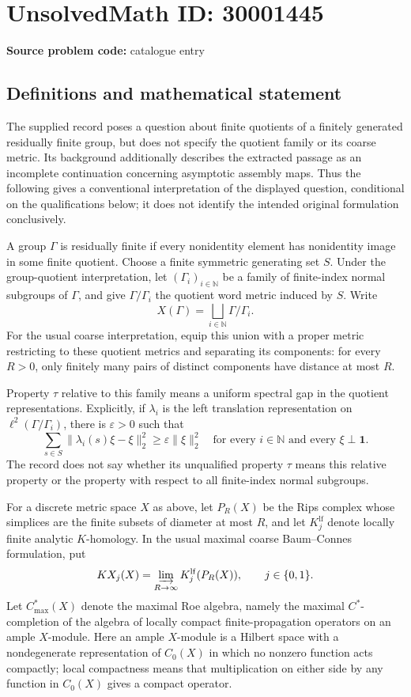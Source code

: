 \documentclass[11pt]{article}
\newcommand{\N}{\mathbb{N}}
\begin{document}
\section*{UnsolvedMath ID: 30001445}
\textbf{Source problem code:} catalogue entry
\subsection{Definitions and mathematical statement}
The supplied record poses a question about finite quotients of a finitely generated residually finite group, but does not specify the quotient family or its coarse metric. Its background additionally describes the extracted passage as an incomplete continuation concerning asymptotic assembly maps. Thus the following gives a conventional interpretation of the displayed question, conditional on the qualifications below; it does not identify the intended original formulation conclusively.

A group \(\Gamma\) is residually finite if every nonidentity element has nonidentity image in some finite quotient. Choose a finite symmetric generating set \(S\). Under the group-quotient interpretation, let \((\Gamma_i)_{i\in\N}\) be a family of finite-index normal subgroups of \(\Gamma\), and give \(\Gamma/\Gamma_i\) the quotient word metric induced by \(S\). Write
\[
X(\Gamma)=\bigsqcup_{i\in\N}\Gamma/\Gamma_i.
\]
For the usual coarse interpretation, equip this union with a proper metric restricting to these quotient metrics and separating its components: for every \(R>0\), only finitely many pairs of distinct components have distance at most \(R\).

Property \(\tau\) relative to this family means a uniform spectral gap in the quotient representations. Explicitly, if \(\lambda_i\) is the left translation representation on \(\ell^2(\Gamma/\Gamma_i)\), there is \(\varepsilon>0\) such that
\[
\sum_{s\in S}\|\lambda_i(s)\xi-\xi\|_2^2
\geq \varepsilon\|\xi\|_2^2
\quad\text{for every }i\in\N
\text{ and every }\xi\perp\mathbf{1}.
\]
The record does not say whether its unqualified property \(\tau\) means this relative property or the property with respect to all finite-index normal subgroups.

For a discrete metric space \(X\) as above, let \(P_R(X)\) be the Rips complex whose simplices are the finite subsets of diameter at most \(R\), and let \(K_j^{\mathrm{lf}}\) denote locally finite analytic \(K\)-homology. In the usual maximal coarse Baum--Connes formulation, put
\[
KX_j(X)=\varinjlim_{R\to\infty}K_j^{\mathrm{lf}}(P_R(X)),
\qquad j\in\{0,1\}.
\]
Let \(C^*_{\max}(X)\) denote the maximal Roe algebra, namely the maximal \(C^*\)-completion of the algebra of locally compact finite-propagation operators on an ample \(X\)-module. Here an ample \(X\)-module is a Hilbert space with a nondegenerate representation of \(C_0(X)\) in which no nonzero function acts compactly; local compactness means that multiplication on either side by any function in \(C_0(X)\) gives a compact operator.
\end{document}
